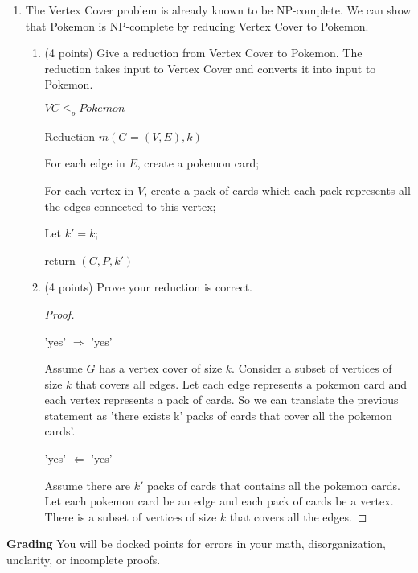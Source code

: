\documentclass[paper=a4, fontsize=11pt]{scrartcl}
\newcommand\tab[1][0.6cm]{\hspace*{#1}}
\numberwithin{equation}{section}		%
\numberwithin{figure}{section}			%
\numberwithin{table}{section}				%
\begin{document}
\begin{enumerate}
\begin{enumerate}
\begin{proof}
	Assume there is no $W \subseteq P$ such that $|W| \leq k$ and $C \subseteq \bigcup_{i \in W} i$. 
	
	Then there exists $W \subseteq P$ and $C \subseteq \bigcup_{i \in W} i$, so $|W| > k$ and we say 'no'.
\end{proof}


\end{enumerate}
\item The Vertex Cover problem is already known to be NP-complete.  We can show that Pokemon is NP-complete by reducing Vertex Cover to Pokemon. 
\begin{enumerate}
\item (4 points) Give a reduction from Vertex Cover to Pokemon.  The reduction takes input to Vertex Cover and converts it into input to Pokemon. 

$VC \leq_p Pokemon$

Reduction $m(G=(V,E) , k)$

\tab For each edge in $E$, create a pokemon card;

\tab For each vertex in $V$, create a pack of cards which each pack represents all the edges connected to this vertex;

\tab Let $k' = k$;

return $(C, P, k')$


\item (4 points) Prove your reduction is correct.
\begin{proof}
	
	\
	
	'yes' $\Rightarrow$ 'yes'
	
	Assume $G$ has a vertex cover of size $k$. Consider a subset of vertices of size $k$ that covers all edges. Let each edge represents a pokemon card and each vertex represents a pack of cards. So we can translate the previous statement as 'there exists k' packs of cards that cover all the pokemon cards'.
	
	'yes' $\Leftarrow$ 'yes'
	
	Assume there are $k'$ packs of cards that contains all the pokemon cards. Let each pokemon card be an edge and each pack of cards be a vertex. There is a subset of vertices of size $k$ that covers all the edges.
\end{proof}


\end{enumerate}
\end{enumerate}

\noindent\textbf{Grading} You will be docked points for errors in your math, disorganization, unclarity, or incomplete proofs. 
\end{document}
